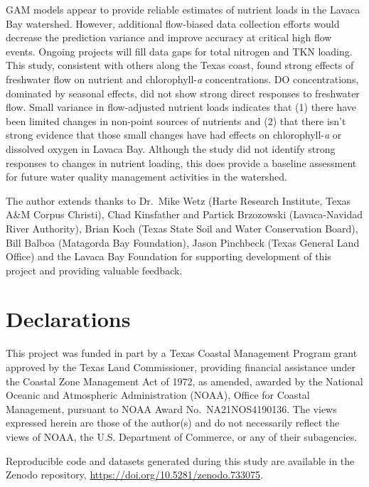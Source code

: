 \documentclass[sn-basic,referee,lineno,pdflatex]{sn-jnl}
\begin{document}
GAM models appear to provide reliable estimates of nutrient loads in the
Lavaca Bay watershed. However, additional flow-biased data collection
efforts would decrease the prediction variance and improve accuracy at
critical high flow events. Ongoing projects will fill data gaps for
total nitrogen and TKN loading. This study, consistent with others along
the Texas coast, found strong effects of freshwater flow on nutrient and
chlorophyll-\emph{a} concentrations. DO concentrations, dominated by
seasonal effects, did not show strong direct responses to freshwater
flow. Small variance in flow-adjusted nutrient loads indicates that (1)
there have been limited changes in non-point sources of nutrients and
(2) that there isn't strong evidence that those small changes have had
effects on chlorophyll-\emph{a} or dissolved oxygen in Lavaca Bay.
Although the study did not identify strong responses to changes in
nutrient loading, this does provide a baseline assessment for future
water quality management activities in the watershed.

\backmatter


The author extends thanks to Dr.~Mike Wetz (Harte Research Institute,
Texas A\&M Corpus Christi), Chad Kinsfather and Partick Brzozowski
(Lavaca-Navidad River Authority), Brian Koch (Texas State Soil and Water
Conservation Board), Bill Balboa (Matagorda Bay Foundation), Jason
Pinchbeck (Texas General Land Office) and the Lavaca Bay Foundation for
supporting development of this project and providing valuable feedback.

\hypertarget{declarations}{%
\section*{Declarations}\label{declarations}}


This project was funded in part by a Texas Coastal Management Program
grant approved by the Texas Land Commissioner, providing financial
assistance under the Coastal Zone Management Act of 1972, as amended,
awarded by the National Oceanic and Atmospheric Administration (NOAA),
Office for Coastal Management, pursuant to NOAA Award
No.~NA21NOS4190136. The views expressed herein are those of the
author(s) and do not necessarily reflect the views of NOAA, the U.S.
Department of Commerce, or any of their subagencies.


Reproducible code and datasets generated during this study are available
in the Zenodo repository, \url{https://doi.org/10.5281/zenodo.733075}.


\end{document}
